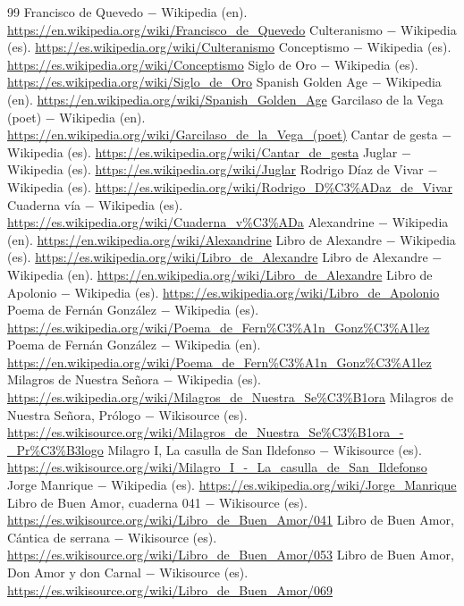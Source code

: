 \documentclass{book}
\begin{document}
\begin{thebibliography}{99}
 Francisco de Quevedo \(-\) Wikipedia (en). \url{https://en.wikipedia.org/wiki/Francisco_de_Quevedo}
 Culteranismo \(-\) Wikipedia (es). \url{https://es.wikipedia.org/wiki/Culteranismo}
 Conceptismo \(-\) Wikipedia (es). \url{https://es.wikipedia.org/wiki/Conceptismo}
 Siglo de Oro \(-\) Wikipedia (es). \url{https://es.wikipedia.org/wiki/Siglo_de_Oro}
 Spanish Golden Age \(-\) Wikipedia (en). \url{https://en.wikipedia.org/wiki/Spanish_Golden_Age}
 Garcilaso de la Vega (poet) \(-\) Wikipedia (en). \url{https://en.wikipedia.org/wiki/Garcilaso_de_la_Vega_(poet)}
 Cantar de gesta \(-\) Wikipedia (es). \url{https://es.wikipedia.org/wiki/Cantar_de_gesta}
 Juglar \(-\) Wikipedia (es). \url{https://es.wikipedia.org/wiki/Juglar}
 Rodrigo Díaz de Vivar \(-\) Wikipedia (es). \url{https://es.wikipedia.org/wiki/Rodrigo_D%C3%ADaz_de_Vivar}
 Cuaderna vía \(-\) Wikipedia (es). \url{https://es.wikipedia.org/wiki/Cuaderna_v%C3%ADa}
 Alexandrine \(-\) Wikipedia (en). \url{https://en.wikipedia.org/wiki/Alexandrine}
 Libro de Alexandre \(-\) Wikipedia (es). \url{https://es.wikipedia.org/wiki/Libro_de_Alexandre}
 Libro de Alexandre \(-\) Wikipedia (en). \url{https://en.wikipedia.org/wiki/Libro_de_Alexandre}
 Libro de Apolonio \(-\) Wikipedia (es). \url{https://es.wikipedia.org/wiki/Libro_de_Apolonio}
 Poema de Fernán González \(-\) Wikipedia (es). \url{https://es.wikipedia.org/wiki/Poema_de_Fern%C3%A1n_Gonz%C3%A1lez}
 Poema de Fernán González \(-\) Wikipedia (en). \url{https://en.wikipedia.org/wiki/Poema_de_Fern%C3%A1n_Gonz%C3%A1lez}
 Milagros de Nuestra Señora \(-\) Wikipedia (es). \url{https://es.wikipedia.org/wiki/Milagros_de_Nuestra_Se%C3%B1ora}
 Milagros de Nuestra Señora, Prólogo \(-\) Wikisource (es). \url{https://es.wikisource.org/wiki/Milagros_de_Nuestra_Se%C3%B1ora_-_Pr%C3%B3logo}
 Milagro I, La casulla de San Ildefonso \(-\) Wikisource (es). \url{https://es.wikisource.org/wiki/Milagro_I_-_La_casulla_de_San_Ildefonso}
 Jorge Manrique \(-\) Wikipedia (es). \url{https://es.wikipedia.org/wiki/Jorge_Manrique}
 Libro de Buen Amor, cuaderna 041 \(-\) Wikisource (es). \url{https://es.wikisource.org/wiki/Libro_de_Buen_Amor/041}
 Libro de Buen Amor, Cántica de serrana \(-\) Wikisource (es). \url{https://es.wikisource.org/wiki/Libro_de_Buen_Amor/053}
 Libro de Buen Amor, Don Amor y don Carnal \(-\) Wikisource (es). \url{https://es.wikisource.org/wiki/Libro_de_Buen_Amor/069}

\end{thebibliography}
\end{document}
